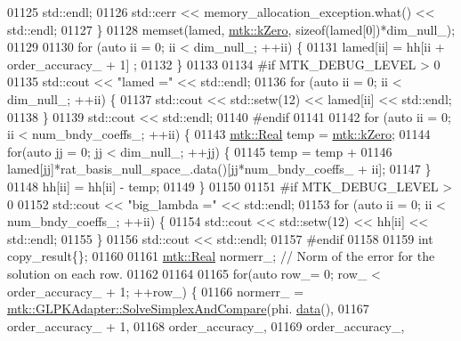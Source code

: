 \begin{DoxyCode}
{{01125         std::endl;
01126       std::cerr << memory\_allocation\_exception.what() << std::endl;
01127     \}
01128     memset(lamed, \hyperlink{group__c01-roots_ga59a451a5fae30d59649bcda274fea271}{mtk::kZero}, \textcolor{keyword}{sizeof}(lamed[0])*dim\_null\_);
01129 
01130     \textcolor{keywordflow}{for} (\textcolor{keyword}{auto} ii = 0; ii < dim\_null\_; ++ii) \{
01131       lamed[ii] = hh[ii + order\_accuracy\_ + 1] ;
01132     \}
01133 
01134 \textcolor{preprocessor}{    #if MTK\_DEBUG\_LEVEL > 0}
01135     std::cout << \textcolor{stringliteral}{"lamed ="} << std::endl;
01136     \textcolor{keywordflow}{for} (\textcolor{keyword}{auto} ii = 0; ii < dim\_null\_; ++ii) \{
01137       std::cout << std::setw(12) << lamed[ii] << std::endl;
01138     \}
01139     std::cout << std::endl;
01140 \textcolor{preprocessor}{    #endif}
01141 
01142     \textcolor{keywordflow}{for} (\textcolor{keyword}{auto} ii = 0; ii < num\_bndy\_coeffs\_; ++ii) \{
01143       \hyperlink{group__c01-roots_gac080bbbf5cbb5502c9f00405f894857d}{mtk::Real} temp = \hyperlink{group__c01-roots_ga59a451a5fae30d59649bcda274fea271}{mtk::kZero};
01144       \textcolor{keywordflow}{for}(\textcolor{keyword}{auto} jj = 0; jj < dim\_null\_; ++jj) \{
01145         temp = temp +
01146           lamed[jj]*rat\_basis\_null\_space\_.data()[jj*num\_bndy\_coeffs\_ + ii];
01147       \}
01148       hh[ii] = hh[ii] - temp;
01149     \}
01150 
01151 \textcolor{preprocessor}{    #if MTK\_DEBUG\_LEVEL > 0}
01152     std::cout << \textcolor{stringliteral}{"big\_lambda ="} << std::endl;
01153     \textcolor{keywordflow}{for} (\textcolor{keyword}{auto} ii = 0; ii < num\_bndy\_coeffs\_; ++ii) \{
01154       std::cout << std::setw(12) << hh[ii] << std::endl;
01155     \}
01156     std::cout << std::endl;
01157 \textcolor{preprocessor}{    #endif}
01158 
01159     \textcolor{keywordtype}{int} copy\_result\{\};
01160 
01161     \hyperlink{group__c01-roots_gac080bbbf5cbb5502c9f00405f894857d}{mtk::Real} normerr\_; \textcolor{comment}{// Norm of the error for the solution on each row.}
01162 
01164 
01165     \textcolor{keywordflow}{for}(\textcolor{keyword}{auto} row\_= 0; row\_ < order\_accuracy\_ + 1; ++row\_) \{
01166       normerr\_ = \hyperlink{classmtk_1_1GLPKAdapter_a834480aca83e3c0d09fdab7fdb7e8a3f}{mtk::GLPKAdapter::SolveSimplexAndCompare}(phi.
      \hyperlink{classmtk_1_1DenseMatrix_a16b3ff56feb2658b9fc7147d1de4d8e7}{data}(),
01167                                                           order\_accuracy\_ + 1,
01168                                                           order\_accuracy\_,
01169                                                           order\_accuracy\_,
}}
\end{DoxyCode}
